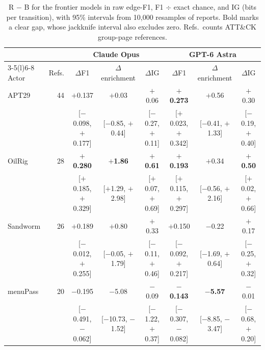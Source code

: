 \begin{table}[t]
\centering
\small
\setlength{\tabcolsep}{4pt}
\begin{tabular}{@{}lrcccccc@{}}
\toprule
 & & \multicolumn{3}{c}{Claude Opus} & \multicolumn{3}{c}{GPT-6 Astra} \\
\cmidrule(lr){3-5}\cmidrule(l){6-8}
Actor & Refs. & $\Delta$F1 & $\Delta$enrichment & $\Delta$IG & $\Delta$F1 & $\Delta$enrichment & $\Delta$IG \\
\midrule
APT29 & 44 & $+$0.137 & $+$0.03 & $+$0.06 & \textbf{$+$0.273} & $+$0.56 & $+$0.30 \\
 & & {\scriptsize [$-$0.098, $+$0.177]} & {\scriptsize [$-$0.85, $+$0.44]} & {\scriptsize [$-$0.27, $+$0.11]} & {\scriptsize [$+$0.023, $+$0.342]} & {\scriptsize [$-$0.41, $+$1.33]} & {\scriptsize [$-$0.19, $+$0.40]} \\
OilRig & 28 & \textbf{$+$0.280} & \textbf{$+$1.86} & \textbf{$+$0.61} & \textbf{$+$0.193} & $+$0.34 & \textbf{$+$0.50} \\
 & & {\scriptsize [$+$0.185, $+$0.329]} & {\scriptsize [$+$1.29, $+$2.98]} & {\scriptsize [$+$0.07, $+$0.69]} & {\scriptsize [$+$0.115, $+$0.297]} & {\scriptsize [$-$0.56, $+$2.16]} & {\scriptsize [$+$0.02, $+$0.66]} \\
Sandworm & 26 & $+$0.189 & $+$0.80 & $+$0.33 & $+$0.150 & $-$0.22 & $+$0.17 \\
 & & {\scriptsize [$-$0.012, $+$0.255]} & {\scriptsize [$-$0.05, $+$1.79]} & {\scriptsize [$-$0.11, $+$0.46]} & {\scriptsize [$-$0.092, $+$0.217]} & {\scriptsize [$-$1.69, $+$0.64]} & {\scriptsize [$-$0.25, $+$0.32]} \\
menuPass & 20 & $-$0.195 & $-$5.08 & $-$0.09 & \textbf{$-$0.143} & \textbf{$-$5.57} & $-$0.01 \\
 & & {\scriptsize [$-$0.491, $-$0.062]} & {\scriptsize [$-$10.73, $-$1.52]} & {\scriptsize [$-$1.22, $+$0.37]} & {\scriptsize [$-$0.307, $-$0.082]} & {\scriptsize [$-$8.85, $-$3.47]} & {\scriptsize [$-$0.68, $+$0.20]} \\
\bottomrule
\end{tabular}
\caption{R $-$ B for the frontier models in raw edge-F1, F1 $\div$ exact chance, and IG (bits per transition), with 95\% intervals from 10{,}000 resamples of reports. Bold marks a clear gap, whose jackknife interval also excludes zero. Refs.\ counts ATT\&CK group-page references.}
\label{tab:h2}
\end{table}
